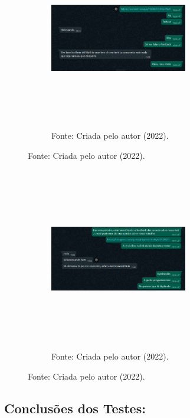 \begin{itemize}
\begin{figure}[!htb]
\centering
\captionsetup[subfigure]{labelformat=empty}
\caption{``Teste 2''}
\begin{subfigure}{.5\textwidth}
\centering
\includegraphics[width=6cm,height=8cm]{Partes/Imagens/teste 2.png}
\caption{Fonte: Criada pelo autor (2022).}
\end{subfigure}%
\end{figure}

\begin{figure}[!htb]
\centering
\captionsetup[subfigure]{labelformat=empty}
\caption{``Teste 3''}
\begin{subfigure}{.5\textwidth}
\centering
\includegraphics[width=6cm,height=8cm]{Partes/Imagens/teste 3.png}
\caption{Fonte: Criada pelo autor (2022).}
\end{subfigure}%
\end{figure}

\newpage

\subsection{Conclusões dos Testes:}


\end{itemize}
